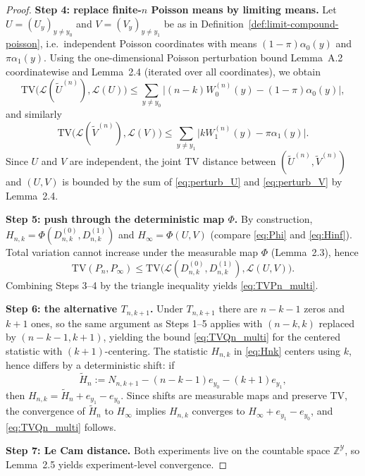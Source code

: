 \documentclass{article}
\begin{document}
\begin{proof}
\textbf{Step 4: replace finite-$n$ Poisson means by limiting means.} Let $U = (U_y)_{y \neq y_0}$ and
$V = (V_y)_{y \neq y_1}$ be as in Definition~\ref{def:limit-compound-poisson}, i.e.\ independent Poisson coordinates with means $(1-\pi)\alpha_0(y)$
and $\pi\alpha_1(y)$. Using the one-dimensional Poisson perturbation bound Lemma~A.2 coordinatewise
and Lemma~2.4 (iterated over all coordinates), we obtain
\begin{equation}
\mathrm{TV}\bigl(\mathcal{L}(\tilde{U}^{(n)}), \mathcal{L}(U)\bigr) \leq \sum_{y \neq y_0} \bigl|(n-k)W^{(n)}_0(y) - (1-\pi)\alpha_0(y)\bigr|, \label{eq:perturb_U}
\end{equation}
and similarly
\begin{equation}
\mathrm{TV}\bigl(\mathcal{L}(\tilde{V}^{(n)}), \mathcal{L}(V)\bigr) \leq \sum_{y \neq y_1} \bigl|k W^{(n)}_1(y) - \pi\alpha_1(y)\bigr|. \label{eq:perturb_V}
\end{equation}
Since $U$ and $V$ are independent, the joint TV distance between $(\tilde{U}^{(n)}, \tilde{V}^{(n)})$ and $(U, V)$ is bounded
by the sum of \eqref{eq:perturb_U} and \eqref{eq:perturb_V} by Lemma~2.4.

\textbf{Step 5: push through the deterministic map $\Phi$.} By construction, $H_{n,k} = \Phi(D^{(0)}_{n,k}, D^{(1)}_{n,k})$
and $H_\infty = \Phi(U, V)$ (compare \eqref{eq:Phi} and \eqref{eq:Hinf}). Total variation cannot increase under the measurable
map $\Phi$ (Lemma~2.3), hence
\[
\mathrm{TV}(P_n, P_\infty) \leq \mathrm{TV}\bigl(\mathcal{L}(D^{(0)}_{n,k}, D^{(1)}_{n,k}), \mathcal{L}(U, V)\bigr).
\]
Combining Steps 3--4 by the triangle inequality yields \eqref{eq:TVPn_multi}.

\textbf{Step 6: the alternative $T_{n,k+1}$.} Under $T_{n,k+1}$ there are $n-k-1$ zeros and $k+1$ ones, so
the same argument as Steps 1--5 applies with $(n-k, k)$ replaced by $(n-k-1, k+1)$, yielding
the bound \eqref{eq:TVQn_multi} for the centered statistic with $(k+1)$-centering. The statistic $H_{n,k}$ in \eqref{eq:Hnk} centers
using $k$, hence differs by a deterministic shift: if
\[
\tilde{H}_n := N_{n,k+1} - (n-k-1)e_{y_0} - (k+1)e_{y_1},
\]
then $H_{n,k} = \tilde{H}_n + e_{y_1} - e_{y_0}$. Since shifts are measurable maps and preserve TV, the convergence of
$\tilde{H}_n$ to $H_\infty$ implies $H_{n,k}$ converges to $H_\infty + e_{y_1} - e_{y_0}$, and \eqref{eq:TVQn_multi} follows.

\textbf{Step 7: Le Cam distance.} Both experiments live on the countable space $\mathbb{Z}^{\mathcal{Y}}$, so Lemma~2.5
yields experiment-level convergence.
\end{proof}
\end{document}
